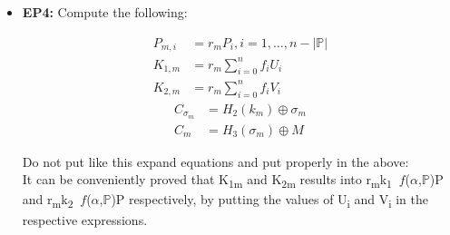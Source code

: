 \documentclass[conference]{IEEEtran}
\begin{document}
{\begin{itemize}
\begin{ceqn}
    \begin{align}
        f(x,\mathbb{P} ) &= \prod_{i=1}^n(x+H_4(i))^{(1-b_i)} 
    \end{align}
\end{ceqn}

The polynomial function $\ f(x, \mathbb{P} )$ is of degree at-most $n$. Let $f\textsubscript{i}$ denote the coefficient of $x\textsubscript{i}$ in the polynomial function $f(x,\mathbb{P} )$ .

\item{\textbf {EP4:}} Compute the following: 
\begin{ceqn}
    \begin{align}
        P_{m,i} &= r_m P_i , i = 1, \ldots, n - |\mathbb{P} |\\
        K_{1,m} &= r_m \sum_{i=0}^n f_i U_i \\ 
        K_{2,m} &= r_m \sum_{i=0}^n f_i V_i 
    \end{align}
    \begin{align}
        C_{\sigma_m} &= H_2(k_m) \oplus \sigma_m \\ 
        C_m &= H_3(\sigma_m) \oplus M 
    \end{align}
\end{ceqn}


{\color{red} Do not put like this expand equations and put properly in the above:}\\

It can be conveniently proved that K\textsubscript{1m} and K\textsubscript{2m} results into r\textsubscript{m}k\textsubscript{1} $\ f$($\alpha$,$\mathbb{P}$)P and r\textsubscript{m}k\textsubscript{2} $\ f$($\alpha$,$\mathbb{P}$)P respectively, by putting the values of U\textsubscript{i} and V\textsubscript{i} in the respective expressions.\\




\end{itemize}



}
\end{document}
